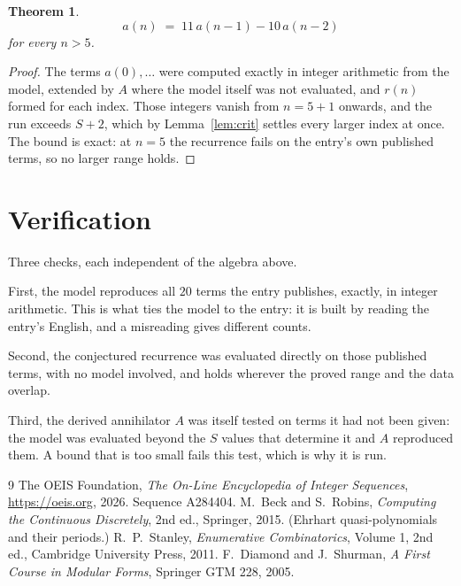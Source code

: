 \documentclass[11pt,a4paper]{article}
\theoremstyle{plain}
\newtheorem{theorem}{Theorem}
\theoremstyle{definition}
\begin{document}
\begin{theorem}
\[
a(n)\;=\;11\,a(n-1) - 10\,a(n-2)
\]
for every $n>5$.
\end{theorem}

\begin{proof}
The terms $a(0),\dots$ were computed exactly in integer arithmetic from the model, extended by
$A$ where the model itself was not evaluated, and $r(n)$ formed for each index. Those integers
vanish from $n=5+1$ onwards, and the run exceeds $S+2$, which by
Lemma~\ref{lem:crit} settles every larger index at once. The bound is exact: at $n=5$ the recurrence fails on the entry's own published terms, so no larger range holds.
\end{proof}

\section{Verification}

Three checks, each independent of the algebra above.

First, the model reproduces all $20$ terms the entry publishes, exactly, in integer
arithmetic. This is what ties the model to the entry: it is built by reading the entry's
English, and a misreading gives different counts.

Second, the conjectured recurrence was evaluated directly on those published terms, with no
model involved, and holds wherever the proved range and the data overlap.

Third, the derived annihilator $A$ was itself tested on terms it had not been given: the model
was evaluated beyond the $S$ values that determine it and $A$ reproduced them. A bound that is
too small fails this test, which is why it is run.

\begin{thebibliography}{9}
 The OEIS Foundation, \emph{The On-Line Encyclopedia of Integer
Sequences}, \url{https://oeis.org}, 2026. Sequence A284404.
 M.~Beck and S.~Robins, \emph{Computing the Continuous Discretely},
2nd ed., Springer, 2015. (Ehrhart quasi-polynomials and their periods.)
 R.~P.~Stanley, \emph{Enumerative Combinatorics}, Volume 1, 2nd ed.,
Cambridge University Press, 2011.
 F.~Diamond and J.~Shurman, \emph{A First Course in Modular Forms},
Springer GTM 228, 2005.
\end{thebibliography}
\end{document}
